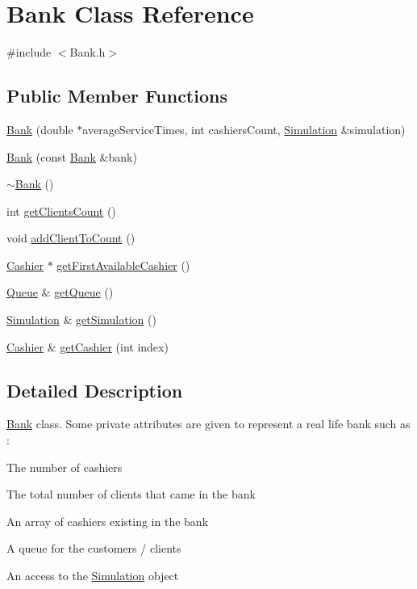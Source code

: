 \hypertarget{classBank}{}\section{Bank Class Reference}
\label{classBank}


{\ttfamily \#include $<$Bank.\+h$>$}

\subsection*{Public Member Functions}
\begin{DoxyCompactItemize}
\item 
\hyperlink{classBank_a50332ff64fd0c79823a9f3c7e7e4c18b}{Bank} (double $\ast$average\+Service\+Times, int cashiers\+Count, \hyperlink{classSimulation}{Simulation} \&simulation)
\item 
\hyperlink{classBank_affa9032a547e660fa64b773fee47f612}{Bank} (const \hyperlink{classBank}{Bank} \&bank)
\item 
\hyperlink{classBank_a86eb33b90cf9dbf0a528155c5bfde004}{$\sim$\+Bank} ()
\item 
int \hyperlink{classBank_a46e579a690e0d3ca175923fcbae30a2d}{get\+Clients\+Count} ()
\item 
void \hyperlink{classBank_a2fe9f47aabc4fe73adc07af460f30dcc}{add\+Client\+To\+Count} ()
\item 
\hyperlink{classCashier}{Cashier} $\ast$ \hyperlink{classBank_a406e1fc9b050ed4559760c5a52fe81e4}{get\+First\+Available\+Cashier} ()
\item 
\hyperlink{classQueue}{Queue} \& \hyperlink{classBank_a79644f520ee9fafdfa1ffa303b84bb4a}{get\+Queue} ()
\item 
\hyperlink{classSimulation}{Simulation} \& \hyperlink{classBank_a8d181c1cfdea6b987602f9e2954cb7ad}{get\+Simulation} ()
\item 
\hyperlink{classCashier}{Cashier} \& \hyperlink{classBank_a7eb0b71ef408a8e9798eb1d28e1733ea}{get\+Cashier} (int index)
\end{DoxyCompactItemize}


\subsection{Detailed Description}
\hyperlink{classBank}{Bank} class. Some private attributes are given to represent a real life bank such as \+:
\begin{DoxyItemize}
\item The number of cashiers
\item The total number of clients that came in the bank
\item An array of cashiers existing in the bank
\item A queue for the customers / clients
\item An access to the \hyperlink{classSimulation}{Simulation} object 
\end{DoxyItemize}

